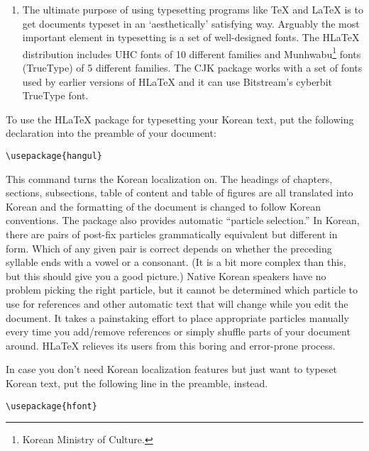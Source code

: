 \begin{enumerate}
The CJK package is not specific to Korean. It can
process input files in UTF-8 as well as in various CJK encodings
including EUC-KR and CP949/Windows-949/UHC, it can be used to typeset documents with
multilingual content (especially Chinese, Japanese and Korean).
The CJK package has no Korean localization such as the one offered by H\LaTeX{} and it
does not come with as many special Korean fonts as H\LaTeX.

\item The ultimate purpose of using typesetting programs like \TeX{}
and \LaTeX{} is to get documents typeset in an `aesthetically' satisfying way.
Arguably the most important element in typesetting is  a set of
well-designed fonts. The H\LaTeX{} distribution
includes UHC \PSi{} fonts 
of 10
different families and
Munhwabu\footnote{Korean Ministry of Culture.}
fonts (TrueType) of 5 different families.
The CJK package works with a set of fonts used by earlier versions
of H\LaTeX{} and it can use Bitstream's cyberbit TrueType
font.
\end{enumerate}

To use the  H\LaTeX{} package for typesetting your Korean text, put the following
declaration into the preamble of your document:
\begin{lscommand}
\verb+\usepackage{hangul}+
\end{lscommand}

This command turns the Korean localization on. The headings
of chapters, sections, subsections, table of content and table of
figures are all translated into Korean and the formatting of the document
is changed to follow Korean conventions. 
The package also provides automatic ``particle selection.''
In Korean, there are pairs of post-fix particles 
grammatically equivalent but different in form. Which 
of any given pair is correct depends on 
whether the preceding syllable ends with a  vowel or a consonant.
(It is a bit more complex than this, but this should give you
a good picture.)
Native Korean speakers have no problem picking the right particle, but
it cannot be determined which particle to use for references and other automatic
text that will change while you edit the document.
It 
takes a painstaking effort to place appropriate particles manually
every time you add/remove references or simply shuffle  parts
of your document around.
H\LaTeX{} relieves its users from this boring and error-prone process.

In case you don't need Korean localization features
but just want 
to  typeset Korean text, put the following line in the 
preamble, instead.
\begin{lscommand}
\verb+\usepackage{hfont}+
\end{lscommand}

